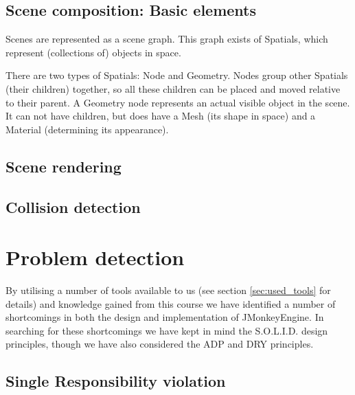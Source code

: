 \documentclass[a4paper, 10pt]{article}
\begin{document}

\subsection{Scene composition: Basic elements}
\label{sec:scene_composition}
Scenes are represented as a scene graph.
This graph exists of Spatials, which represent (collections of) objects in space. 

There are two types of Spatials: Node and Geometry.
Nodes group other Spatials (their children) together, 
so all these children can be placed and moved relative to their parent.
A Geometry node represents an actual visible object in the scene.
It can not have children, but does have a Mesh (its shape in space) 
and a Material (determining its appearance).

\subsection{Scene rendering}
\label{sec:scene_rendering}


\subsection{Collision detection}
\label{sec:collision_detection}


\newpage
\section{Problem detection}
\label{sec:problem_detection}

By utilising a number of tools available to us (see section
\ref{sec:used_tools} for details) and knowledge gained from this
course we have identified a number of shortcomings in both the design
and implementation of JMonkeyEngine. In searching for these
shortcomings we have kept in mind the  S.O.L.I.D. design principles,
though we have also considered the ADP and DRY principles.


\subsection{Single Responsibility violation}
\label{sec:srp_violation}
\end{document}
